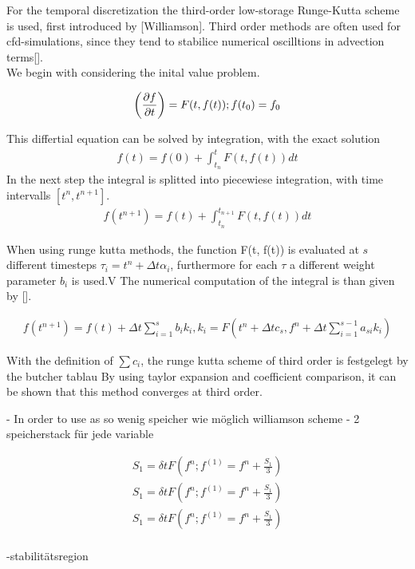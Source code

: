 For the temporal discretization the third-order low-storage Runge-Kutta scheme is used, first introduced by [Williamson].
Third order methods are often used for cfd-simulations, since they tend to stabilice numerical oscilltions in advection terms[].\\
We begin with considering the inital value problem.

\begin{align}
    \left(\pdn[f]{t}\right) = F(t, f(t)) ; f(t_0) = f_0
\end{align}

This differtial equation can be solved by integration, with the exact solution
\begin{align}
    f(t) = f(0) + \int_{t_n}^{t}F(t, f(t))dt
\end{align}
In the next step the integral is splitted into piecewiese integration, with time intervalls $[t^n, t^{n+1}]$.
\begin{align}
    f(t^{n+1}) = f(t) + \int_{t_n}^{t_{n+1}}F(t, f(t))dt
\end{align}

When using runge kutta methods, the function F(t, f(t)) is evaluated at $s$ different timesteps $\tau_i = t^n + \Delta t \alpha_i$,
furthermore for each $\tau$ a different weight parameter $b_i$ is used.V
The numerical computation of the integral is than given by [].

\begin{align}
    f(t^{n+1}) = f(t) + \Delta t \sum_{i=1}^s b_i k_i, k_i = F(t^n + \Delta t c_s, f^n + \Delta t \sum_{i=1}^{s-1}a_{si}k_i)
\end{align}

With the definition of $\sum c_i$, the runge kutta scheme of third order is festgelegt by the butcher tablau
By using taylor expansion and coefficient comparison, it can be shown that this  method converges at third order.


- In order to use as  so wenig speicher wie möglich williamson scheme
- 2 speicherstack für jede variable

\begin{align}
    S_1 = \delta t F(f^n ; f^(1) = f^n + \frac{S_1}{3}) \\
    S_1 = \delta t F(f^n ; f^(1) = f^n + \frac{S_1}{3}) \\
    S_1 = \delta t F(f^n ; f^(1) = f^n + \frac{S_1}{3}) \\
\end{align}


-stabilitätsregion

